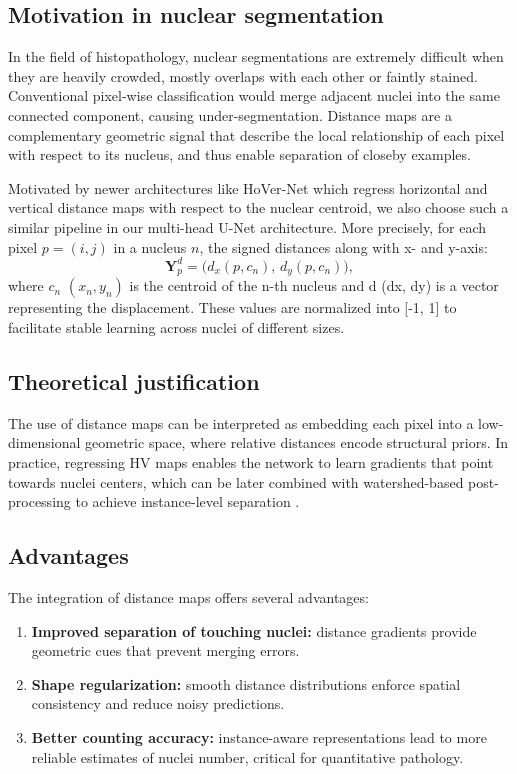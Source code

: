 \documentclass[target=bach,aauheader=,style=]{thud}
\begin{document}
\subsection{Motivation in nuclear segmentation}
In the field of histopathology, nuclear segmentations are extremely difficult when they are heavily crowded, mostly overlaps with each other or faintly stained.
Conventional pixel-wise classification would merge adjacent nuclei into the same connected component, causing under-segmentation.
Distance maps are a complementary geometric signal that describe the local relationship of each pixel with respect to its nucleus, and thus enable separation of closeby examples.

Motivated by newer architectures like HoVer-Net \cite{graham2019hovernet} which regress horizontal and vertical distance maps with respect to the nuclear centroid, we also choose such a similar pipeline in our multi-head U-Net architecture.
More precisely, for each pixel $p=(i,j)$ in a nucleus $n$, the signed distances along with x- and y-axis:
\[
\mathbf{Y}^d_{p} = \big(d_x(p,c_n),\, d_y(p,c_n)\big),
\]
where $c_n$ $(x_{n}, y_{n})$ is the centroid of the n-th nucleus and d (dx, dy) is a vector representing the displacement.
These values are normalized into [-1, 1] to facilitate stable learning across nuclei of different sizes.
\subsection{Theoretical justification}
The use of distance maps can be interpreted as embedding each pixel into a low-dimensional geometric space, where relative distances encode structural priors.  
In practice, regressing HV maps enables the network to learn gradients that point towards nuclei centers, which can be later combined with watershed-based post-processing to achieve instance-level separation \cite{vu2019methods}.

\subsection{Advantages}
The integration of distance maps offers several advantages:
\begin{enumerate}
    \item \textbf{Improved separation of touching nuclei:} distance gradients provide geometric cues that prevent merging errors.
    \item \textbf{Shape regularization:} smooth distance distributions enforce spatial consistency and reduce noisy predictions.
    \item \textbf{Better counting accuracy:} instance-aware representations lead to more reliable estimates of nuclei number, critical for quantitative pathology.
\end{enumerate}
\end{document}
